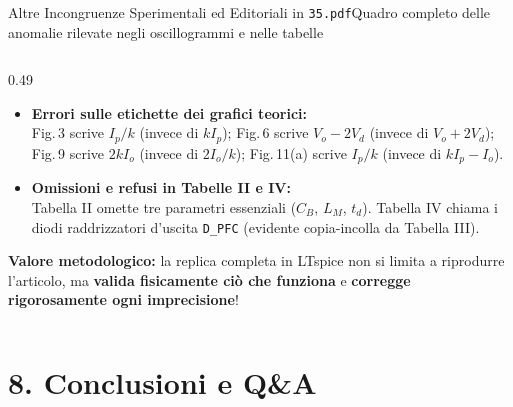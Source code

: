 \documentclass[aspectratio=169,9pt]{beamer}
\begin{document}
\begin{frame}{Altre Incongruenze Sperimentali ed Editoriali in \texttt{35.pdf}}{Quadro completo delle anomalie rilevate negli oscillogrammi e nelle tabelle}
\begin{columns}[T,onlytextwidth]
\begin{column}{0.49\textwidth}
\begin{itemize}
        \item \textbf{Errori sulle etichette dei grafici teorici:}\\
              Fig.\,3 scrive $I_p/k$ (invece di $k I_p$); Fig.\,6 scrive $V_o - 2V_d$ (invece di $V_o + 2V_d$); Fig.\,9 scrive $2kI_o$ (invece di $2I_o/k$); Fig.\,11(a) scrive $I_p/k$ (invece di $kI_p - I_o$).
        \item \textbf{Omissioni e refusi in Tabelle II e IV:}\\
              Tabella II omette tre parametri essenziali ($C_B$, $L_M$, $t_d$). Tabella IV chiama i diodi raddrizzatori d'uscita \texttt{D\_PFC} (evidente copia-incolla da Tabella III).
      \end{itemize}
      \vspace*{2mm}
      \begin{okbox}
        \textbf{Valore metodologico:} la replica completa in LTspice non si limita a riprodurre l'articolo, ma \textbf{valida fisicamente ci\`o che funziona} e \textbf{corregge rigorosamente ogni imprecisione}!
      \end{okbox}
    \end{column}
  \end{columns}
\end{frame}

\section{8. Conclusioni e Q\&A}
\end{document}
